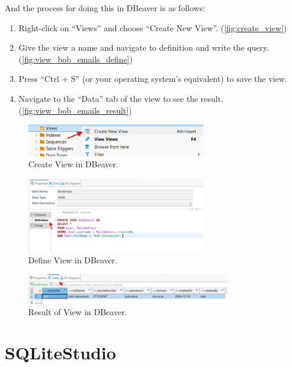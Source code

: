 \documentclass[a4paper,11pt,oneside]{article}
\begin{document}
\begin{sloppypar}
And the process for doing this in DBeaver is as follows:
\begin{enumerate}
  \item Right-click on ``Views'' and choose ``Create New View''. (\autoref{fig:create_view})
  \item Give the view a name and navigate to definition and write the query. (\autoref{fig:view_bob_emails_define})
  \item Press ``Ctrl + S'' (or your operating system's equivalent) to save the view.
  \item Navigate to the ``Data'' tab of the view to see the result. (\autoref{fig:view_bob_emails_result})
\end{enumerate}


\begin{figure}[!htb]
  \centering
  \includegraphics[width=0.7\textwidth]{dbeaver/create_view.png}
  \caption{Create View in DBeaver.}
  \label{fig:create_view}
\end{figure}

\begin{figure}[!htb]
  \centering
  \includegraphics[width=0.7\textwidth]{dbeaver/view_bob_emails_define.png}
  \caption{Define View in DBeaver.}
  \label{fig:view_bob_emails_define}
\end{figure}

\begin{figure}[!htb]
  \centering
  \includegraphics[width=0.8\textwidth]{dbeaver/view_bob_emails_result.png}
  \caption{Result of View in DBeaver.}
  \label{fig:view_bob_emails_result}
\end{figure}

\section{SQLiteStudio}
\label{sqliteStudio}


\end{sloppypar}
\end{document}
